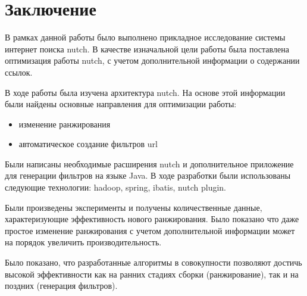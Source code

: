\chapter*{Заключение}
В рамках данной работы было выполнено прикладное исследование системы интернет поиска nutch. В качестве изначальной цели работы была поставлена оптимизация работы nutch, с учетом дополнительной информации о содержании ссылок.

В ходе работы была изучена архитектура nutch. На основе этой информации были найдены основные направления для оптимизации работы:
\begin{itemize}
 \item изменение ранжирования
 \item автоматическое создание фильтров url
\end{itemize}

Были написаны необходимые расширения nutch и дополнительное приложение для генерации фильтров на языке Java. В ходе разработки были использованы следующие технологии: hadoop, spring, ibatis, nutch plugin. 

Были произведены эксперименты и получены количественные данные, характеризующие эффективность нового ранжирования. Было показано что даже простое изменение ранжирования с учетом дополнительной информации может на порядок увеличить производительность.

Было показано, что разработанные алгоритмы в совокупности позволяют достичь высокой эффективности как на ранних стадиях сборки (ранжирование), так и на поздних (генерация фильтров).
